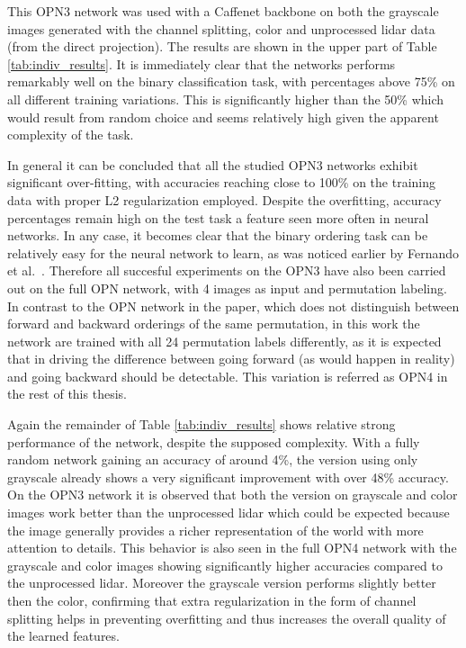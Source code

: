 This OPN3 network was used with a Caffenet backbone on both the grayscale images generated with the channel splitting, color and unprocessed lidar data (from the direct projection). The results are shown in the upper part of Table \ref{tab:indiv_results}. It is immediately clear that the networks performs remarkably well on the binary classification task, with percentages above 75\% on all different training variations. This is significantly higher than the 50\% which would result from random choice and seems relatively high given the apparent complexity of the task. 


In general it can be concluded that all the studied OPN3 networks exhibit significant over-fitting, with accuracies reaching close to 100\% on the training data with proper L2 regularization employed. Despite the overfitting, accuracy percentages remain high on the test task a feature seen more often in neural networks. In any case, it becomes clear that the binary ordering task can be relatively easy for the neural network to learn, as was noticed earlier by Fernando et al.~\cite{fernando2017}. Therefore all succesful experiments on the OPN3 have also been carried out on the full OPN network\cite{lee2017}, with 4 images as input and permutation labeling. In contrast to the OPN network in the paper, which does not distinguish between forward and backward orderings of the same permutation, in this work the network are trained with all 24 permutation labels differently, as it is expected that in driving the difference between going forward (as would happen in reality) and going backward should be detectable. This variation is referred as OPN4 in the rest of this thesis.

Again the remainder of Table \ref{tab:indiv_results} shows relative strong performance of the network, despite the supposed complexity. With a fully random network gaining an accuracy of around 4\%, the version using only grayscale already shows a very significant improvement with over 48\% accuracy. On the OPN3 network it is observed that both the version on grayscale and color images work better than the unprocessed lidar which could be expected because the image generally provides a richer representation of the world with more attention to details. This behavior is also seen in the full OPN4 network with the grayscale and color images showing significantly higher accuracies compared to the unprocessed lidar. Moreover  the grayscale version performs slightly better then the color, confirming that extra regularization in the form of channel splitting helps in preventing overfitting and thus increases the overall quality of the learned features.

